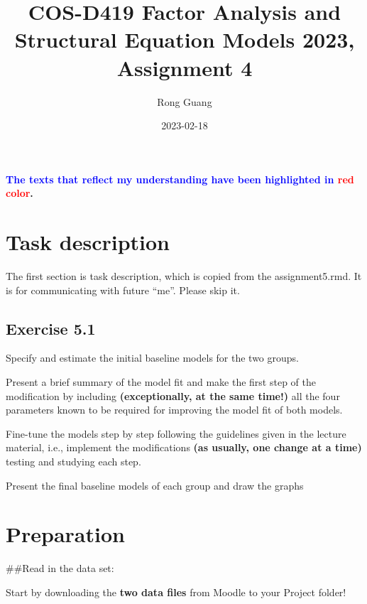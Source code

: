 \documentclass[
]{article}
\title{COS-D419 Factor Analysis and Structural Equation Models 2023, Assignment 4}
\author{Rong Guang}
\date{2023-02-18}
\begin{document}
\maketitle

{
\setcounter{tocdepth}{2}
\tableofcontents
}
\textbf{\textcolor{blue}{The texts that reflect my understanding have been highlighted in} \textcolor{red}{red color}.}

\hypertarget{task-description}{%
\section{Task description}\label{task-description}}

The first section is task description, which is copied from the assignment5.rmd. It is for communicating with future ``me''. Please skip it.

\hypertarget{exercise-5.1}{%
\subsection{Exercise 5.1}\label{exercise-5.1}}

Specify and estimate the initial baseline models for the two groups.

Present a brief summary of the model fit and make the first step of the modification by including \textbf{(exceptionally, at the same time!)} all the four parameters known to be required for improving the model fit of both models.

Fine-tune the models step by step following the guidelines given in the lecture material, i.e., implement the modifications \textbf{(as usually, one change at a time)} testing and studying each step.

Present the final baseline models of each group and draw the graphs

\hypertarget{preparation}{%
\section{Preparation}\label{preparation}}

\#\#Read in the data set:

Start by downloading the \textbf{two data files} from Moodle to your Project folder!
\end{document}
